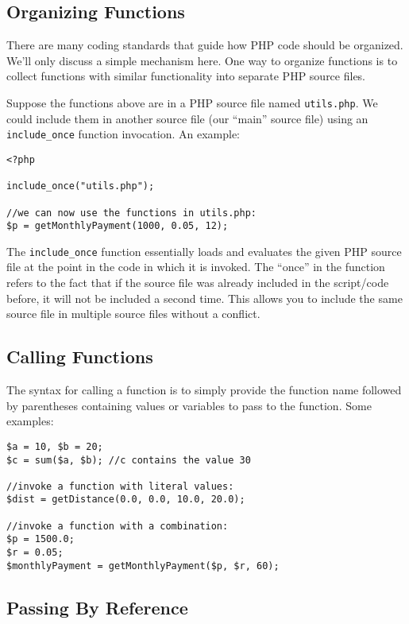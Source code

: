 \subsection{Organizing Functions}

There are many coding standards that guide how PHP code
should be organized.  We'll only discuss a simple mechanism 
here.  One way to organize functions is to collect functions
with similar functionality into separate PHP source files.  

Suppose the functions above are in a PHP source file named 
\texttt{utils.php}.  We could include them in another
source file (our ``main'' source file) using an \texttt{include_once}
function invocation.  An example:

\begin{verbatim}
<?php

include_once("utils.php");

//we can now use the functions in utils.php:
$p = getMonthlyPayment(1000, 0.05, 12);
\end{verbatim}

The \texttt{include_once} function essentially loads and
evaluates the given PHP source file at the point in the code in which
it is invoked.  The ``once'' in the function refers to the fact that if
the source file was already included in the script/code before, it will
not be included a second time.  This allows you to include the same
source file in multiple source files without a conflict.

\subsection{Calling Functions}

The syntax for calling a function is to simply provide the function 
name followed by parentheses containing values or variables 
to pass to the function.  Some examples:

\begin{verbatim}
$a = 10, $b = 20;
$c = sum($a, $b); //c contains the value 30

//invoke a function with literal values:
$dist = getDistance(0.0, 0.0, 10.0, 20.0);

//invoke a function with a combination:
$p = 1500.0;
$r = 0.05;
$monthlyPayment = getMonthlyPayment($p, $r, 60);
\end{verbatim}

\subsection{Passing By Reference}

